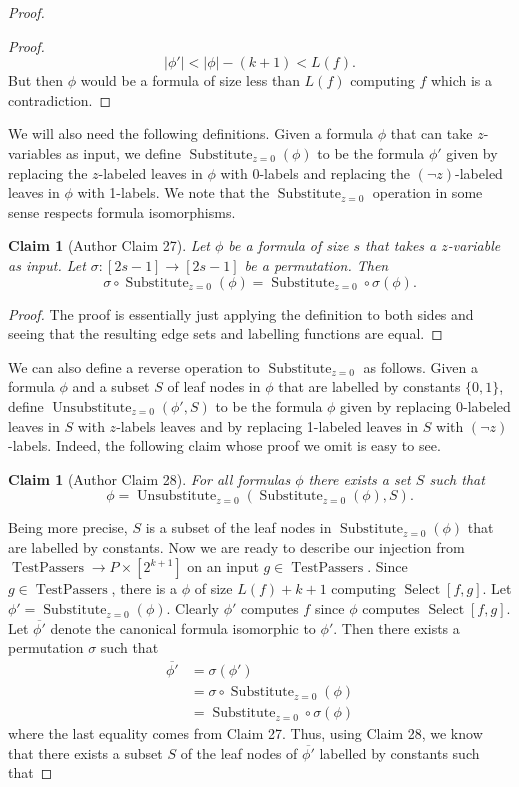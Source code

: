 \documentclass[10pt,a4paper]{article}
\newtheorem{ntclaim}[nttheorem]{Claim}
\newcommand{\Select}{\operatorname{Select}}
\newcommand{\Subz}{\operatorname{Substitute}_{z=0}}
\newcommand{\Unsubz}{\operatorname{Unsubstitute}_{z=0}}
\begin{document}
\begin{proof}
\begin{proof}
\[|\phi'|<|\phi|-(k+1)<L(f).\]
But then $\phi$ would be a formula of size less than $L(f)$ computing $f$ which is a contradiction.
\end{proof}
We will also need the following definitions. Given a formula $\phi$ that can take $z$-variables as input, we define $\Subz(\phi)$ to be the formula $\phi'$ given by replacing the $z$-labeled leaves in $\phi$ with 0-labels and replacing the $(\neg z)$-labeled leaves in $\phi$ with 1-labels.
We note that the $\Subz$ operation in some sense respects formula isomorphisms.
\begin{ntclaim}[Author Claim 27]
Let $\phi$ be a formula of size $s$ that takes a $z$-variable as input. Let $\sigma:[2s-1]\to[2s-1]$ be a permutation. Then
\[\sigma\circ\Subz(\phi)=\Subz\circ\sigma(\phi).\]
\end{ntclaim}
\begin{proof}
The proof is essentially just applying the definition to both sides and seeing that the resulting edge sets and labelling functions are equal.
\end{proof}
We can also define a reverse operation to $\Subz$ as follows. Given a formula $\phi$ and a subset $S$ of leaf nodes in $\phi$ that are labelled by constants $\{0,1\}$, define $\Unsubz(\phi',S)$ to be the formula $\phi$ given by replacing 0-labeled leaves in $S$ with $z$-labels leaves and by replacing 1-labeled leaves in $S$ with $(\neg z)$-labels.
Indeed, the following claim whose proof we omit is easy to see.
\begin{ntclaim}[Author Claim 28]
For all formulas $\phi$ there exists a set $S$ such that
\[\phi=\Unsubz(\Subz(\phi),S).\]
\end{ntclaim}
Being more precise, $S$ is a subset of the leaf nodes in $\Subz(\phi)$ that are labelled by constants.
Now we are ready to describe our injection from $\operatorname{TestPassers}\to P\times[2^{k+1}]$ on an input $g\in\operatorname{TestPassers}$. Since $g\in\operatorname{TestPassers}$, there is a $\phi$ of size $L(f)+k+1$ computing $\Select[f,g]$. Let $\phi'=\Subz(\phi)$. Clearly $\phi'$ computes $f$ since $\phi$ computes $\Select[f,g]$. Let $\overline{\phi'}$ denote the canonical formula isomorphic to $\phi'$. Then there exists a permutation $\sigma$ such that
\begin{align*}\overline{\phi'}&=\sigma(\phi')\\&=\sigma\circ\Subz(\phi)\\&=\Subz\circ\sigma(\phi)\end{align*}
where the last equality comes from Claim 27. Thus, using Claim 28, we know that there exists a subset $S$ of the leaf nodes of $\overline{\phi'}$ labelled by constants such that

\end{proof}
\end{document}
